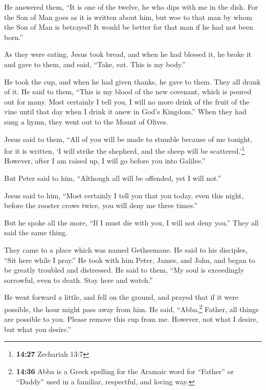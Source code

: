  He answered them, ``It is one of the twelve, he who dips
with me in the dish.  For the Son of Man goes as it is
written about him, but woe to that man by whom the Son of Man is
betrayed! It would be better for that man if he had not been born.''

 As they were eating, Jesus took bread, and when he had
blessed it, he broke it and gave to them, and said, ``Take, eat. This is
my body.''

 He took the cup, and when he had given thanks, he gave
to them. They all drank of it.  He said to them, ``This
is my blood of the new covenant, which is poured out for many.
 Most certainly I tell you, I will no more drink of the
fruit of the vine until that day when I drink it anew in God's
Kingdom.''  When they had sung a hymn, they went out to
the Mount of Olives.

 Jesus said to them, ``All of you will be made to stumble
because of me tonight, for it is written, `I will strike the shepherd,
and the sheep will be scattered.'\footnote{\textbf{14:27} Zechariah 13:7}
 However, after I am raised up, I will go before you into
Galilee.''

 But Peter said to him, ``Although all will be offended,
yet I will not.''

 Jesus said to him, ``Most certainly I tell you that you
today, even this night, before the rooster crows twice, you will deny me
three times.''

 But he spoke all the more, ``If I must die with you, I
will not deny you.'' They all said the same thing.

 They came to a place which was named Gethsemane. He said
to his disciples, ``Sit here while I pray.''  He took
with him Peter, James, and John, and began to be greatly troubled and
distressed.  He said to them, ``My soul is exceedingly
sorrowful, even to death. Stay here and watch.''

 He went forward a little, and fell on the ground, and
prayed that if it were possible, the hour might pass away from him.
 He said, ``Abba,\footnote{\textbf{14:36} Abba is a Greek
  spelling for the Aramaic word for ``Father'' or ``Daddy'' used in a
  familiar, respectful, and loving way.} Father, all things are possible
to you. Please remove this cup from me. However, not what I desire, but
what you desire.''

